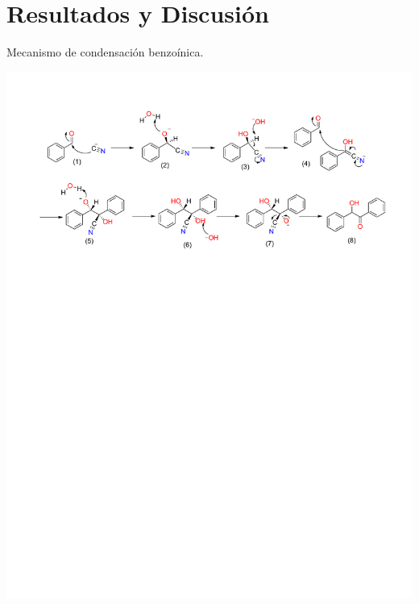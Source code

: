 \documentclass[fleqn,10pt]{SelfArx}
\begin{document}

\newpage
\section{Resultados y Discusi\'on}
\begin{scheme}[h]
	\centering
	\caption{Mecanismo de condensaci\'on benzo\'inica.}
	\includegraphics[width=\linewidth]{structures/mecanismo_benzoina.pdf}
\end{scheme}
\end{document}
